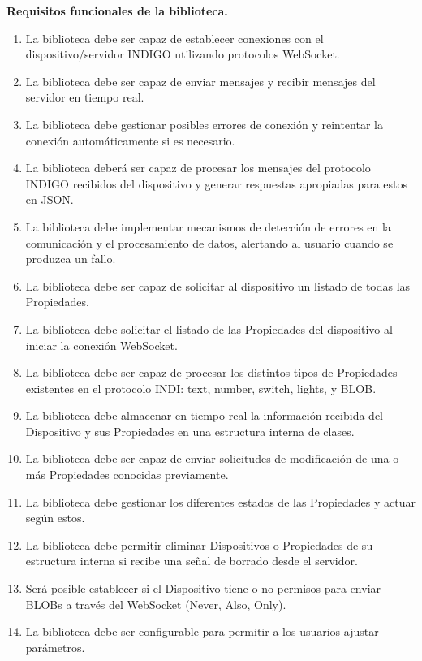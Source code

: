 \textbf{Requisitos funcionales de la biblioteca.}

\begin{enumerate}[label=\textbf{R1.1.\arabic*.}, leftmargin=10mm]
  \item La biblioteca debe ser capaz de establecer conexiones con el\\ dispositivo/servidor INDIGO utilizando protocolos WebSocket.
  \item La biblioteca debe ser capaz de enviar mensajes y recibir mensajes del servidor en tiempo real.
  \item La biblioteca debe gestionar posibles errores de conexión y reintentar la conexión automáticamente si es necesario.
  \item La biblioteca deberá ser capaz de procesar los mensajes del protocolo INDIGO recibidos del dispositivo y generar respuestas apropiadas para estos en JSON.
  \item La biblioteca debe implementar mecanismos de detección de errores en la comunicación y el procesamiento de datos, alertando al usuario cuando se produzca un fallo.
  \item La biblioteca debe ser capaz de solicitar al dispositivo un listado de todas las Propiedades. 
  \item La biblioteca debe solicitar el listado de las Propiedades del dispositivo al iniciar la conexión WebSocket.
  \item La biblioteca debe ser capaz de procesar los distintos tipos de Propiedades existentes en el protocolo INDI: text, number, switch, lights, y BLOB.
  \item La biblioteca debe almacenar en tiempo real la información recibida del Dispositivo y sus Propiedades en una estructura interna de clases.
  \item La biblioteca debe ser capaz de enviar solicitudes de modificación de una o más Propiedades conocidas previamente.
  \item La biblioteca debe gestionar los diferentes estados de las Propiedades y actuar según estos.
  \item La biblioteca debe permitir eliminar Dispositivos o Propiedades de su estructura interna si recibe una señal de borrado desde el servidor.
  \item Será posible establecer si el Dispositivo tiene o no permisos para enviar BLOBs a través del WebSocket (Never, Also, Only).
  \item La biblioteca debe ser configurable para permitir a los usuarios ajustar parámetros.
\end{enumerate}


